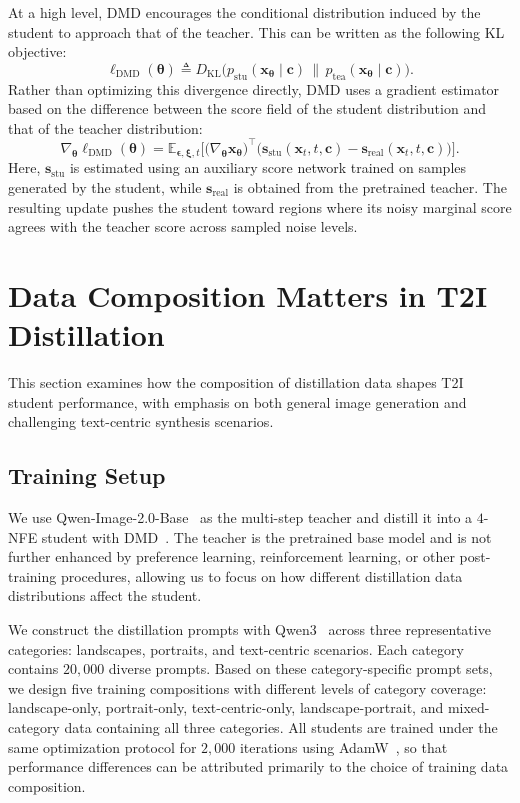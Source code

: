 \documentclass{llmxive}
\providecommand{\bm}[1]{\boldsymbol{#1}}
\begin{document}
At a high level, DMD encourages the conditional distribution induced by the student to approach that of the teacher. This can be written as the following KL objective:
\begin{equation}
\ell_{\text{DMD}}(\bm{\theta})
\triangleq
D_{\mathrm{KL}}
\big(
p_{\text{stu}}(\bm{x}_{\bm{\theta}}\mid \bm c)
\,\|\,
p_{\text{tea}}(\bm{x}_{\bm{\theta}}\mid \bm c)
\big).
\end{equation}
Rather than optimizing this divergence directly, DMD uses a gradient estimator based on the difference between the score field of the student distribution and that of the teacher distribution:
\begin{equation}
\nabla_{\bm \theta} \ell_{\text{DMD}}(\bm\theta)
=
\mathbb{E}_{\bm{\epsilon},\bm{\xi},t}
\Big[\big(\nabla_{\bm{\theta}} \bm{x}_{\bm{\theta}}\big)^\intercal
\big(
\bm s_{\text{stu}}(\bm{x}_t,t,\bm c)
-
\bm s_{\text{real}}(\bm{x}_t,t,\bm c)
\big)
\Big].
\label{eq:dmd}
\end{equation}
Here, $\bm s_{\text{stu}}$ is estimated using an auxiliary score network trained on samples generated by the student, while $\bm s_{\text{real}}$ is obtained from the pretrained teacher. The resulting update pushes the student toward regions where its noisy marginal score agrees with the teacher score across sampled noise levels.




\section{Data Composition Matters in T2I Distillation}
\label{sec:data_composition}
This section examines how the composition of distillation data shapes T2I student performance, with emphasis on both general image generation and challenging text-centric synthesis scenarios.


\subsection{Training Setup}
We use Qwen-Image-2.0-Base~\citep{zhao2026qwen} as the multi-step teacher and distill it into a $4$-NFE student with DMD~\citep{yin2024improved}. The teacher is the pretrained base model and is not further enhanced by preference learning, reinforcement learning, or other post-training procedures, allowing us to focus on how different distillation data distributions affect the student.

We construct the distillation prompts with Qwen3~\citep{yang2025qwen3} across three representative categories: landscapes, portraits, and text-centric scenarios. Each category contains $20{,}000$ diverse prompts. Based on these category-specific prompt sets, we design five training compositions with different levels of category coverage: landscape-only, portrait-only, text-centric-only, landscape-portrait, and mixed-category data containing all three categories. All students are trained under the same optimization protocol for $2{,}000$ iterations using AdamW~\citep{loshchilov2017decoupled}, so that performance differences can be attributed primarily to the choice of training data composition.
\end{document}
